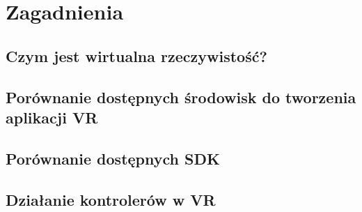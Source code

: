 \chapter{Zagadnienia}
\label{ch:zagadnienia}


\section{Czym jest wirtualna rzeczywistość?}
\label{sec:vr}
%
\section{Porównanie dostępnych środowisk do tworzenia aplikacji VR}
\label{sec:enviroment}
\section{Porównanie dostępnych SDK}
\label{sec:sdk}
%
\section{Działanie kontrolerów w VR}
\label{sec:kontroleryVR}
	
	